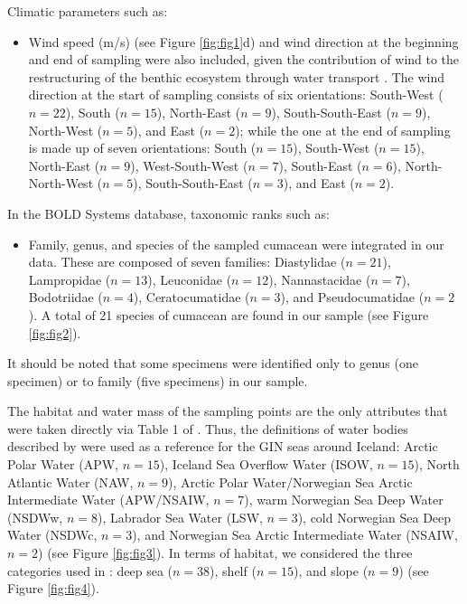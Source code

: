 Climatic parameters such as: 
\begin{itemize}
\item Wind speed (m/s) (see Figure \ref{fig:fig1}d) and wind direction at the beginning and end of sampling were also included, given the contribution of wind to the restructuring of the benthic ecosystem through water transport \citep{waga_recent_2020,saeedi_environmental_2022}. The wind direction at the start of sampling consists of six orientations: South-West ($n=22$), South ($n=15$), North-East ($n=9$), South-South-East ($n=9$), North-West ($n=5$), and East ($n=2$); while the one at the end of sampling is made up of seven orientations: South ($n=15$), South-West ($n=15$), North-East ($n=9$), West-South-West ($n=7$), South-East ($n=6$), North-North-West ($n=5$), South-South-East ($n=3$), and East ($n=2$). 
\end{itemize}

In the BOLD Systems database, taxonomic ranks such as: 
\begin{itemize}
\item Family, genus, and species of the sampled cumacean were integrated in our data. These are composed of seven families: Diastylidae ($n=21$), Lampropidae ($n=13$), Leuconidae ($n=12$), Nannastacidae ($n=7$), Bodotriidae ($n=4$), Ceratocumatidae ($n=3$), and Pseudocumatidae ($n=2$). A total of 21 species of cumacean are found in our sample (see Figure \ref{fig:fig2}).
\end{itemize}

It should be noted that some specimens were identified only to genus (one specimen) or to family (five specimens) in our sample.
 
The habitat and water mass of the sampling points are the only attributes that were taken directly via Table 1 of \citep{uhlir_adding_2021}. Thus, the definitions of water bodies described by \citep{hansen_north_2000, brix2010distribution, ostmann_marine_2014} were used as a reference for the GIN seas around Iceland: Arctic Polar Water (APW, $n=15$), Iceland Sea Overflow Water (ISOW, $n=15$), North Atlantic Water (NAW, $n=9$), Arctic Polar Water/Norwegian Sea Arctic Intermediate Water (APW/NSAIW, $n=7$), warm Norwegian Sea Deep Water (NSDWw, $n=8$), Labrador Sea Water (LSW, $n=3$), cold Norwegian Sea Deep Water (NSDWc, $n=3$), and Norwegian Sea Arctic Intermediate Water (NSAIW, $n=2$) (see Figure \ref{fig:fig3}). In terms of habitat, we considered the three categories used in \citep{uhlir_adding_2021}: deep sea ($n=38$), shelf ($n=15$), and slope ($n=9$) (see Figure \ref{fig:fig4}).

